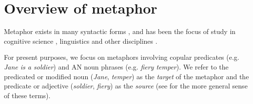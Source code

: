 \documentclass[9pt,twocolumn,twoside,lineno]{pnas-new}
\begin{document}









\section{Overview of metaphor}

	Metaphor exists in many syntactic forms \cite{black1954metaphor}, and has been the focus of study in cognitive science \cite{tourangeau1981aptness,roberts1994people,camp2006metaphor}, linguistics \cite{glucksberg1993metaphors,lakoff1993contemporary} and other disciplines \cite{martin1990computational,davidson}.

	For present purposes, we focus on metaphors involving copular predicates (e.g. \emph{Jane is a soldier}) and AN noun phrases (e.g. \emph{fiery temper}). We refer to the predicated or modified noun (\emph{Jane}, \emph{temper}) as the \emph{target} of the metaphor and the predicate or adjective (\emph{soldier}, \emph{fiery}) as the \emph{source} (see \cite{lakoff1980metaphors} for the more general sense of these terms).
\end{document}
